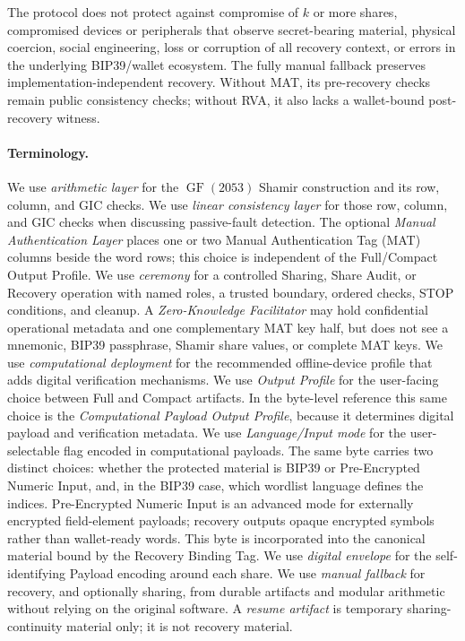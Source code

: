 \documentclass[11pt]{article}
\newcommand{\GF}{\operatorname{GF}}
\begin{document}
The protocol does not protect against compromise of $k$ or more shares, compromised devices or peripherals that observe secret-bearing material, physical coercion, social engineering, loss or corruption of all recovery context, or errors in the underlying BIP39/wallet ecosystem. The fully manual fallback preserves implementation-independent recovery. Without MAT, its pre-recovery checks remain public consistency checks; without RVA, it also lacks a wallet-bound post-recovery witness.

\paragraph{Terminology.} We use \emph{arithmetic layer} for the $\GF(2053)$ Shamir construction and its row, column, and GIC checks. We use \emph{linear consistency layer} for those row, column, and GIC checks when discussing passive-fault detection. The optional \emph{Manual Authentication Layer} places one or two Manual Authentication Tag (MAT) columns beside the word rows; this choice is independent of the Full/Compact Output Profile. We use \emph{ceremony} for a controlled Sharing, Share Audit, or Recovery operation with named roles, a trusted boundary, ordered checks, STOP conditions, and cleanup. A \emph{Zero-Knowledge Facilitator} may hold confidential operational metadata and one complementary MAT key half, but does not see a mnemonic, BIP39 passphrase, Shamir share values, or complete MAT keys. We use \emph{computational deployment} for the recommended offline-device profile that adds digital verification mechanisms. We use \emph{Output Profile} for the user-facing choice between Full and Compact artifacts. In the byte-level reference this same choice is the \emph{Computational Payload Output Profile}, because it determines digital payload and verification metadata. We use \emph{Language/Input mode} for the user-selectable flag encoded in computational payloads. The same byte carries two distinct choices: whether the protected material is BIP39 or Pre-Encrypted Numeric Input, and, in the BIP39 case, which wordlist language defines the indices. Pre-Encrypted Numeric Input is an advanced mode for externally encrypted field-element payloads; recovery outputs opaque encrypted symbols rather than wallet-ready words. This byte is incorporated into the canonical material bound by the Recovery Binding Tag. We use \emph{digital envelope} for the self-identifying Payload encoding around each share. We use \emph{manual fallback} for recovery, and optionally sharing, from durable artifacts and modular arithmetic without relying on the original software. A \emph{resume artifact} is temporary sharing-continuity material only; it is not recovery material.
\end{document}
